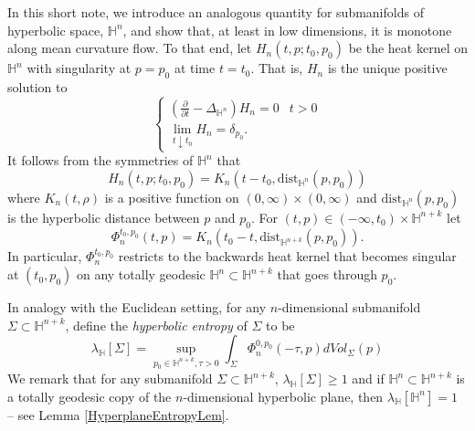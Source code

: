 \documentclass{amsart}
\theoremstyle{definition}
\theoremstyle{remark}
\numberwithin{equation}{section}
\newcommand{\dist}[0]{\mathrm{dist}}
\begin{document}
In this short note, we introduce an analogous quantity for submanifolds of hyperbolic space, $\mathbb{H}^n$, and show that, at least in low dimensions, it is monotone along mean curvature flow. To that end, let $H_n(t,p; t_0,p_0)$
be the heat kernel on $\mathbb{H}^n$ with singularity at $p=p_0$ at time $t=t_0$. 
That is, $H_n$ is the unique positive solution to
$$
\left\{\begin{array}{cc} \left( \frac{\partial}{\partial t}-\Delta_{\mathbb{H}^n}\right)H_n=0 & t>0\\
 \lim_{t\downarrow t_0} H_n =\delta_{p_0}.\end{array}\right.
$$
It follows from the symmetries of $\mathbb{H}^n$ that 
$$
H_n(t, p;t_0, p_0)=K_n(t-t_0,\dist_{\mathbb{H}^n}(p,p_0))
$$
where $K_n(t,\rho)$ is a positive function on $(0,\infty)\times (0,\infty)$ and $\dist_{\mathbb{H}^n}(p,p_0)$ is the hyperbolic distance between $p$ and $p_0$. 
For $(t,p)\in (-\infty, t_0)\times \mathbb{H}^{n+k}$ let 
$$
\Phi_n^{t_0,p_0}(t,p)=K_n(t_0-t,\dist_{\mathbb{H}^{n+k}}(p,p_0)).
$$
In particular,  $\Phi_n^{t_0,p_0}$ restricts to the backwards heat kernel that becomes singular at $(t_0,p_0)$ on any totally geodesic $\mathbb{H}^n\subset \mathbb{H}^{n+k}$ that goes through $p_0$. 

In analogy with the Euclidean setting, for any $n$-dimensional submanifold $\Sigma\subset \mathbb{H}^{n+k}$, define the \emph{hyperbolic entropy} of $\Sigma$ to be
$$
\lambda_{\mathbb{H}}[\Sigma]=\sup_{p_0\in \mathbb{H}^{n+k}, \tau>0} \int_{\Sigma} \Phi_n^{0,p_0}(-\tau,p) dVol_{\Sigma}(p)
$$
We remark that for any submanifold $\Sigma\subset \mathbb{H}^{n+k}$, $\lambda_{\mathbb{H}}[\Sigma]\geq 1$ and if $\mathbb{H}^n\subset \mathbb{H}^{n+k}$ is a totally geodesic copy of the $n$-dimensional hyperbolic plane, then $\lambda_{\mathbb{H}}[\mathbb{H}^n]=1$ -- see Lemma \ref{HyperplaneEntropyLem}. 
\end{document}
